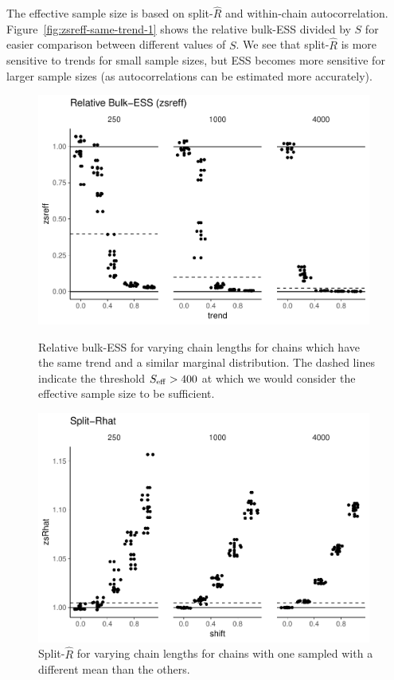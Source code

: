 \documentclass[american,]{article}
\theoremstyle{definition}
\begin{document}
The effective sample size is based on split-\(\widehat{R}\) and
within-chain autocorrelation. Figure~\ref{fig:zsreff-same-trend-1}
shows the relative bulk-ESS divided by \(S\) for easier
comparison between different values of \(S\).
%
We see that split-\(\widehat{R}\) is more sensitive to trends for
small sample sizes, but ESS becomes more sensitive for larger sample
sizes (as autocorrelations can be estimated more accurately).
\begin{figure}[tp]
  \centering
  \begin{minipage}{0.48\textwidth}
  \includegraphics[width=0.98\textwidth]{graphics/zsreff-same-trend-1.pdf}
  \caption{Relative bulk-ESS for varying chain lengths for chains which have
    the same trend and a similar marginal distribution. The dashed
    lines indicate the threshold \(S_{\rm eff} > 400\) at which we
    would consider the effective sample size to be sufficient.}
  \label{fig:zsreff-same-trend-1}
\end{minipage}
\hfill
  \begin{minipage}{0.48\textwidth}
  \includegraphics[width=0.98\textwidth]{graphics/zsrhat-shifted-chain-1.pdf}
  \caption{Split-\(\widehat{R}\) for varying chain lengths
    for chains with one sampled with a different mean than the others.\\~\\~}
  \label{fig:zsrhat-shifted-chain-1}
\end{minipage}
\end{figure}
\end{document}
